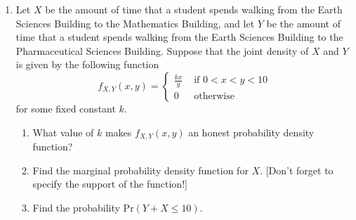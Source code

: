 \documentclass[11pt]{article}
\newcommand{\pr}{\text{Pr}}
\begin{document}
\begin{enumerate}[label=\textbf{Question \arabic*:},start=1]
\item Let $X$ be the amount of time that a student spends walking from the Earth Sciences Building to the Mathematics Building, and let $Y$ be the amount of time that a student spends walking from the Earth Sciences Building to the Pharmaceutical Sciences Building. Suppose that the joint density of $X$ and $Y$ is given by the following function
\[
f_{X,Y}(x,y) = \left\{
\begin{array}{ll}
\frac {kx}y & \mbox{ if } 0 < x < y < 10 \\
0 & \mbox{ otherwise} 
\end{array}
\right.
\]
for some fixed constant $k$. 
\begin{enumerate}
	\item What value of $k$ makes $f_{X,Y}(x,y)$ an honest probability density function?\\

	\item Find the marginal probability density function for $X$. [Don't forget to specify the support of the function!]\\

	\item Find the probability $\pr(Y + X \leq 10)$.


\end{enumerate}

\end{enumerate}
\end{document}
